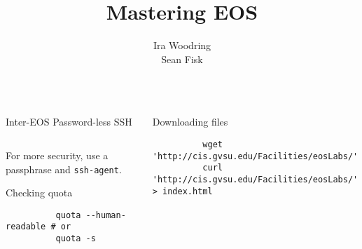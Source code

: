\documentclass[8pt]{beamer}
\title{Mastering EOS}
\author[Woodring \& Fisk]{Ira Woodring \mailtohref{woodriir@gvsu.edu} \\
  Sean Fisk \mailtohref{fiskse@mail.gvsu.edu}}
\institute[GVSU]{Grand Valley State University}
\begin{document}
\begin{frame}[fragile]{}
  \begin{columns}
    \begin{column}{0.49\textwidth}
      \vfill
      \begin{block}{Inter-EOS Password-less SSH}
        \inputminted[tabsize=2]{bash}{scripts/ssh.bash}
        \bigskip
        For more security, use a passphrase and \texttt{ssh-agent}.
      \end{block}
      \vfill
      \begin{block}{Checking quota}
        \begin{verbatim}
          quota --human-readable # or
          quota -s
        \end{verbatim}
      \end{block}
      \vfill
    \end{column}
    \begin{column}{0.49\textwidth}
      \vfill
      \begin{block}{Downloading files}
        \begin{verbatim}
          wget 'http://cis.gvsu.edu/Facilities/eosLabs/'
          curl 'http://cis.gvsu.edu/Facilities/eosLabs/' > index.html
        \end{verbatim}

\end{block}
\end{column}
\end{columns}
\end{frame}
\end{document}
